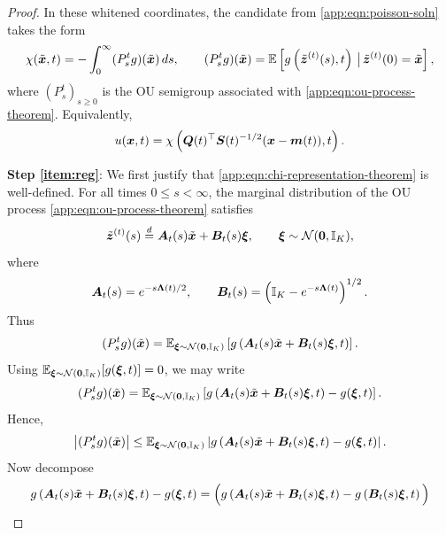 \begin{proof}
In these whitened coordinates, the candidate from \cref{app:eqn:poisson-soln} takes the form
\begin{equation}\label{app:eqn:chi-representation-theorem}
    \chi(\tilde{\boldsymbol{x}},t) = -\int_0^\infty (P_s^t g)(\tilde{\boldsymbol{x}})\,ds, \qquad (P_s^t g)(\tilde{\boldsymbol{x}}) = \mathbb{E}\left[g\left(\tilde{\boldsymbol{z}}^{(t)}(s),t\right)\,\big|\,\tilde{\boldsymbol{z}}^{(t)}(0)=\tilde{\boldsymbol{x}}\right],
\end{equation}
where $(P_s^t)_{s \geq 0}$ is the OU semigroup associated with \cref{app:eqn:ou-process-theorem}.
Equivalently,
\begin{equation*}
    u(\boldsymbol{x},t) = \chi\left( \boldsymbol{Q}(t)^\top\boldsymbol{S}(t)^{-1/2}(\boldsymbol{x}-\boldsymbol{m}(t)),t \right).
\end{equation*}

\medskip
\textbf{Step \ref{item:reg}}:
We first justify that \cref{app:eqn:chi-representation-theorem} is well-defined.
For all times $0 \le s < \infty$, the marginal distribution of the OU process
\eqref{app:eqn:ou-process-theorem} satisfies
\begin{equation*}
    \tilde{\boldsymbol{z}}^{(t)}(s) \overset{d}{=} \boldsymbol{A}_t(s)\tilde{\boldsymbol{x}} + \boldsymbol{B}_t(s)\boldsymbol{\xi}, \qquad \boldsymbol{\xi} \sim \mathcal{N}(\boldsymbol{0},\mathbb{I}_K),
\end{equation*}
where
\begin{equation*}
    \boldsymbol{A}_t(s) = e^{-s\boldsymbol{\Lambda}(t)/2}, \qquad \boldsymbol{B}_t(s) = \left(\mathbb{I}_K - e^{-s\boldsymbol{\Lambda}(t)}\right)^{1/2}.
\end{equation*}
Thus
\begin{equation*}
    (P_s^t g)(\tilde{\boldsymbol{x}}) = \mathbb{E}_{\boldsymbol{\xi} \sim \mathcal{N}(\boldsymbol{0},\mathbb{I}_K)} \left[g\left(\boldsymbol{A}_t(s)\tilde{\boldsymbol{x}}+\boldsymbol{B}_t(s)\boldsymbol{\xi}, t\right) \right].
\end{equation*}
Using $\mathbb{E}_{\boldsymbol{\xi} \sim \mathcal{N}(\boldsymbol{0},\mathbb{I}_K)}[g(\boldsymbol{\xi},t)] = 0$, we may write
\begin{equation*}
    (P_s^t g)(\tilde{\boldsymbol{x}}) = \mathbb{E}_{\boldsymbol{\xi} \sim \mathcal{N}(\boldsymbol{0},\mathbb{I}_K)} \left[ g\left(\boldsymbol{A}_t(s)\tilde{\boldsymbol{x}}+\boldsymbol{B}_t(s)\boldsymbol{\xi},t\right) - g(\boldsymbol{\xi},t) \right].
\end{equation*}
Hence,
\begin{equation*}
    \left|(P_s^t g)(\tilde{\boldsymbol{x}})\right| \leq \mathbb{E}_{\boldsymbol{\xi} \sim \mathcal{N}(\boldsymbol{0},\mathbb{I}_K)} \left| g\left(\boldsymbol{A}_t(s)\tilde{\boldsymbol{x}}+\boldsymbol{B}_t(s)\boldsymbol{\xi},t\right)-g(\boldsymbol{\xi},t) \right|.
\end{equation*}
Now decompose
\begin{equation*}
\begin{aligned}
    g\left(\mbA_t(s)\tilde\mbx+\mbB_t(s)\mbxi,t\right)-g(\mbxi,t) &= \Big( g\left(\mbA_t(s)\tilde\mbx+\mbB_t(s)\mbxi,t\right) - g\left(\mbB_t(s)\mbxi,t\right) \Big) \\

\end{aligned}
\end{equation*}
\end{proof}
